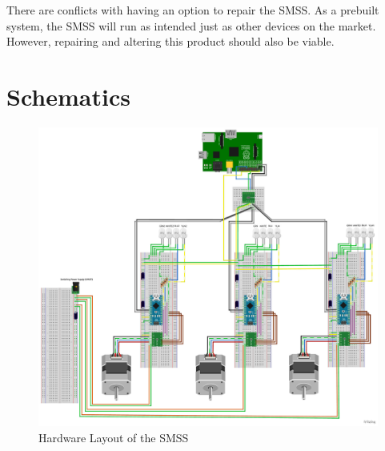 \documentclass[journal]{IEEEtran}
\begin{document}
        There are conflicts with having an option to repair the SMSS. As a prebuilt system, the SMSS will run as intended just as other devices on the market. However, repairing and altering this product should also be viable.
    



\newpage
\quad
\newpage

\section{Schematics}
    \label{Appendix:Schematic}
    \begin{figure}[H]
        \centering
        \includegraphics[scale = 0.35]{Images/fritz_layout.pdf}
        \caption{Hardware Layout of the SMSS}
        \label{fig:fritz_layout}
    \end{figure}
        
    \newpage
    \quad
    \newpage
\end{document}

